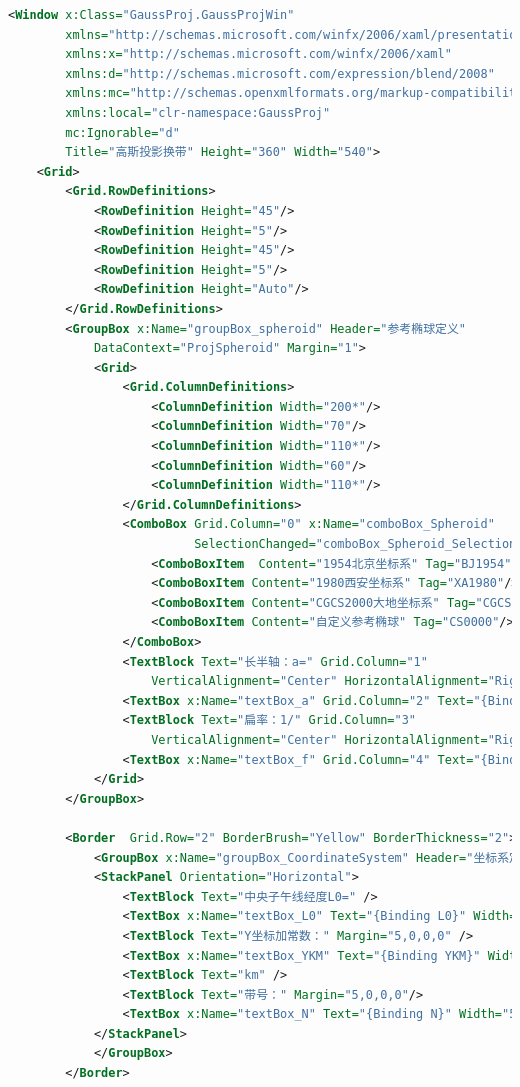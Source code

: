 \begin{lstlisting}[language=xml]
<Window x:Class="GaussProj.GaussProjWin"
        xmlns="http://schemas.microsoft.com/winfx/2006/xaml/presentation"
        xmlns:x="http://schemas.microsoft.com/winfx/2006/xaml"
        xmlns:d="http://schemas.microsoft.com/expression/blend/2008"
        xmlns:mc="http://schemas.openxmlformats.org/markup-compatibility/2006"
        xmlns:local="clr-namespace:GaussProj"
        mc:Ignorable="d"
        Title="高斯投影换带" Height="360" Width="540">
    <Grid>
        <Grid.RowDefinitions>
            <RowDefinition Height="45"/>
            <RowDefinition Height="5"/>
            <RowDefinition Height="45"/>
            <RowDefinition Height="5"/>
            <RowDefinition Height="Auto"/>
        </Grid.RowDefinitions>
        <GroupBox x:Name="groupBox_spheroid" Header="参考椭球定义" 
            DataContext="ProjSpheroid" Margin="1">
            <Grid>
                <Grid.ColumnDefinitions>
                    <ColumnDefinition Width="200*"/>
                    <ColumnDefinition Width="70"/>
                    <ColumnDefinition Width="110*"/>
                    <ColumnDefinition Width="60"/>
                    <ColumnDefinition Width="110*"/>
                </Grid.ColumnDefinitions>
                <ComboBox Grid.Column="0" x:Name="comboBox_Spheroid" 
                          SelectionChanged="comboBox_Spheroid_SelectionChanged">
                    <ComboBoxItem  Content="1954北京坐标系" Tag="BJ1954"/>
                    <ComboBoxItem Content="1980西安坐标系" Tag="XA1980"/>
                    <ComboBoxItem Content="CGCS2000大地坐标系" Tag="CGCS2000"/>
                    <ComboBoxItem Content="自定义参考椭球" Tag="CS0000"/>
                </ComboBox>
                <TextBlock Text="长半轴：a=" Grid.Column="1" 
                    VerticalAlignment="Center" HorizontalAlignment="Right"/>
                <TextBox x:Name="textBox_a" Grid.Column="2" Text="{Binding a}"/>
                <TextBlock Text="扁率：1/" Grid.Column="3" 
                    VerticalAlignment="Center" HorizontalAlignment="Right"/>
                <TextBox x:Name="textBox_f" Grid.Column="4" Text="{Binding f}"/>
            </Grid>
        </GroupBox>

        <Border  Grid.Row="2" BorderBrush="Yellow" BorderThickness="2">
            <GroupBox x:Name="groupBox_CoordinateSystem" Header="坐标系定义">
            <StackPanel Orientation="Horizontal">
                <TextBlock Text="中央子午线经度L0=" />
                <TextBox x:Name="textBox_L0" Text="{Binding L0}" Width="50"/>
                <TextBlock Text="Y坐标加常数：" Margin="5,0,0,0" />
                <TextBox x:Name="textBox_YKM" Text="{Binding YKM}" Width="50"/>
                <TextBlock Text="km" />
                <TextBlock Text="带号：" Margin="5,0,0,0"/>
                <TextBox x:Name="textBox_N" Text="{Binding N}" Width="50"/>
            </StackPanel>
            </GroupBox>
        </Border>
        

\end{lstlisting}

